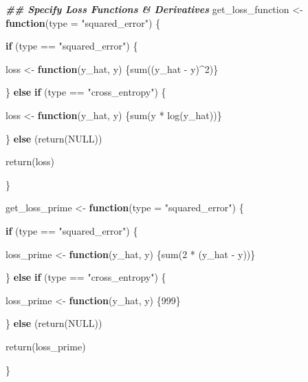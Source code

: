 \documentclass[
]{book}
\newenvironment{Shaded}{\begin{snugshade}}{\end{snugshade}}
\newcommand{\AttributeTok}[1]{\textcolor[rgb]{0.77,0.63,0.00}{#1}}
\newcommand{\ConstantTok}[1]{\textcolor[rgb]{0.00,0.00,0.00}{#1}}
\newcommand{\ControlFlowTok}[1]{\textcolor[rgb]{0.13,0.29,0.53}{\textbf{#1}}}
\newcommand{\DecValTok}[1]{\textcolor[rgb]{0.00,0.00,0.81}{#1}}
\newcommand{\DocumentationTok}[1]{\textcolor[rgb]{0.56,0.35,0.01}{\textbf{\textit{#1}}}}
\newcommand{\FunctionTok}[1]{\textcolor[rgb]{0.00,0.00,0.00}{#1}}
\newcommand{\NormalTok}[1]{#1}
\newcommand{\OtherTok}[1]{\textcolor[rgb]{0.56,0.35,0.01}{#1}}
\newcommand{\SpecialCharTok}[1]{\textcolor[rgb]{0.00,0.00,0.00}{#1}}
\newcommand{\StringTok}[1]{\textcolor[rgb]{0.31,0.60,0.02}{#1}}
\begin{document}
\begin{Shaded}
\begin{Highlighting}[]
\DocumentationTok{\#\# Specify Loss Functions \& Derivatives}
\NormalTok{get\_loss\_function }\OtherTok{\textless{}{-}} \ControlFlowTok{function}\NormalTok{(}\AttributeTok{type =} \StringTok{"squared\_error"}\NormalTok{) \{}
  
  \ControlFlowTok{if}\NormalTok{ (type }\SpecialCharTok{==} \StringTok{"squared\_error"}\NormalTok{) \{}
    
\NormalTok{    loss }\OtherTok{\textless{}{-}} \ControlFlowTok{function}\NormalTok{(y\_hat, y) \{}\FunctionTok{sum}\NormalTok{((y\_hat }\SpecialCharTok{{-}}\NormalTok{ y)}\SpecialCharTok{\^{}}\DecValTok{2}\NormalTok{)\}}
    
\NormalTok{  \} }\ControlFlowTok{else} \ControlFlowTok{if}\NormalTok{ (type }\SpecialCharTok{==} \StringTok{"cross\_entropy"}\NormalTok{) \{}
    
\NormalTok{    loss }\OtherTok{\textless{}{-}} \ControlFlowTok{function}\NormalTok{(y\_hat, y) \{}\FunctionTok{sum}\NormalTok{(y }\SpecialCharTok{*} \FunctionTok{log}\NormalTok{(y\_hat))\}}
    
\NormalTok{  \} }\ControlFlowTok{else}\NormalTok{ (}\FunctionTok{return}\NormalTok{(}\ConstantTok{NULL}\NormalTok{))}
  
  \FunctionTok{return}\NormalTok{(loss)}

\NormalTok{\}}

\NormalTok{get\_loss\_prime }\OtherTok{\textless{}{-}} \ControlFlowTok{function}\NormalTok{(}\AttributeTok{type =} \StringTok{"squared\_error"}\NormalTok{) \{}
  
  \ControlFlowTok{if}\NormalTok{ (type }\SpecialCharTok{==} \StringTok{"squared\_error"}\NormalTok{) \{}
    
\NormalTok{    loss\_prime }\OtherTok{\textless{}{-}} \ControlFlowTok{function}\NormalTok{(y\_hat, y) \{}\FunctionTok{sum}\NormalTok{(}\DecValTok{2} \SpecialCharTok{*}\NormalTok{ (y\_hat }\SpecialCharTok{{-}}\NormalTok{ y))\}}
    
\NormalTok{  \} }\ControlFlowTok{else} \ControlFlowTok{if}\NormalTok{ (type }\SpecialCharTok{==} \StringTok{"cross\_entropy"}\NormalTok{) \{}
    
\NormalTok{    loss\_prime }\OtherTok{\textless{}{-}} \ControlFlowTok{function}\NormalTok{(y\_hat, y) \{}\DecValTok{999}\NormalTok{\}}
    
\NormalTok{  \} }\ControlFlowTok{else}\NormalTok{ (}\FunctionTok{return}\NormalTok{(}\ConstantTok{NULL}\NormalTok{))}
  
  \FunctionTok{return}\NormalTok{(loss\_prime)}

\NormalTok{\}}
\end{Highlighting}
\end{Shaded}
\end{document}
